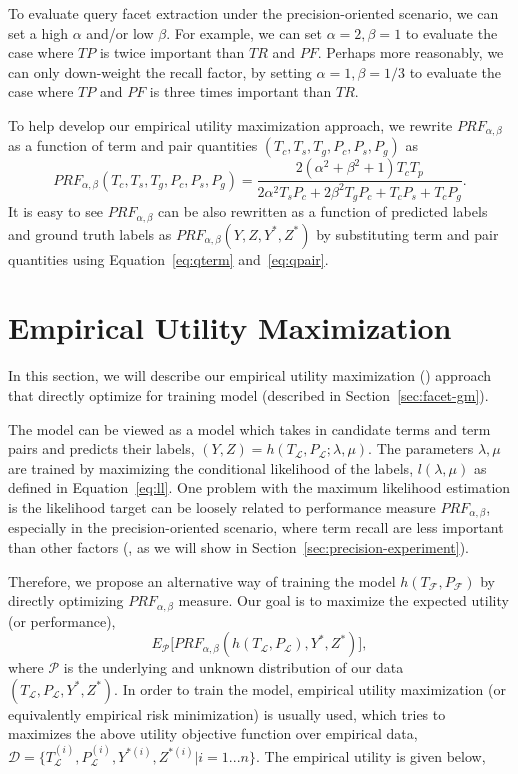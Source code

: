 To evaluate query facet extraction under the precision-oriented scenario, we can set a high $\alpha$ and/or low $\beta$. For example, we can set $\alpha\!=\!2,\beta\!=\!1$ to evaluate the case where $T\!P$ is twice important than $T\!R$ and $P\!F$. Perhaps more reasonably, we can only down-weight the recall factor, by setting $\alpha\!=\!1,\beta\!=\!1/3$ to evaluate the case where $T\!P$ and $P\!F$ is three times important than $T\!R$.

To help develop our empirical utility maximization approach, we rewrite $P\!R\!F_{\alpha,\beta}$ as a function of term and pair quantities $(T_c,T_s,T_g,P_c,P_s,P_g)$ as
\begin{equation}
\label{eq:prfc}
 P\!R\!F_{\alpha,\beta}(T_c,T_s,T_g,P_c,P_s,P_g) =\frac{2(\alpha^2 + \beta^2 + 1)T_cT_p}{2\alpha^2T_sP_c+2\beta^2T_gP_c+T_cP_s+T_cP_g}.
\end{equation}
It is easy to see $P\!R\!F_{\alpha,\beta}$ can be also rewritten as a function of predicted labels and ground truth labels as $P\!R\!F_{\alpha,\beta}(Y,Z,Y^{*},Z^{*})$ by substituting term and pair quantities using Equation~\ref{eq:qterm} and~\ref{eq:qpair}.


\section{Empirical Utility Maximization}
\label{sec:precision-eum}
In this section, we will describe our empirical utility maximization (\EUM) approach that directly optimize \PRF for training \QF model (described in Section~\ref{sec:facet-gm}). 

The \QF model can be viewed as a model which takes in candidate terms and term pairs and predicts their labels, $(Y, Z)=h(T_\mathcal{L},P_\mathcal{L};\lambda,\mu)$. The parameters $\lambda,\mu$ are trained by maximizing the conditional likelihood of the labels, $l(\lambda,\mu)$ as defined in Equation~\ref{eq:ll}. One problem with the maximum likelihood estimation is the likelihood target can be loosely related to performance measure $P\!R\!F_{\alpha,\beta}$, especially in the precision-oriented scenario, where term recall are less important than other factors (, as we will show in Section~\ref{sec:precision-experiment}).

Therefore, we propose an alternative way of training the model $h(T_\mathcal{F},P_\mathcal{F})$ by directly optimizing $P\!R\!F_{\alpha,\beta}$ measure. Our goal is to maximize the expected utility (or performance),
\begin{equation}
 E_\mathcal{P}\big[P\!R\!F_{\alpha,\beta}(h(T_\mathcal{L},P_\mathcal{L}),Y^*,Z^*)\big],
\end{equation}
where $\mathcal{P}$ is the underlying and unknown distribution of our data $(T_\mathcal{L},P_\mathcal{L},Y^*,Z^*)$. In order to train the model, empirical utility maximization (or equivalently empirical risk minimization) is usually used, which tries to maximizes the above utility objective function over empirical data,  $\mathcal{D}=\{T_{\mathcal{L}}^{(i)},P_{\mathcal{L}}^{(i)},Y^{*(i)},Z^{*(i)}|i=1...n\}$. The empirical utility is given below, 


